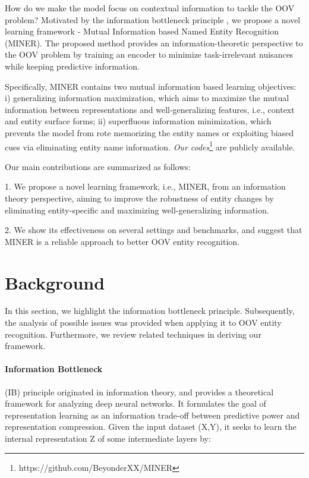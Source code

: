\documentclass[11pt]{article}
\begin{document}
How do we make the model focus on contextual information to tackle the OOV problem? Motivated by the information bottleneck principle \cite{tishby2000information}, we propose a novel learning framework - Mutual Information based Named Entity Recognition (MINER). The proposed method provides an information-theoretic perspective to the OOV problem by training an encoder to minimize task-irrelevant nuisances while keeping predictive information.


Specifically, MINER contains two mutual information based learning objectives: i) generalizing information maximization, which aims to maximize the mutual information between representations and well-generalizing features, i.e., context and entity surface forms; ii) superfluous information minimization, which prevents the model from rote memorizing the entity names or exploiting biased cues via eliminating entity name information. \textit{Our codes}\footnote{https://github.com/BeyonderXX/MINER} are publicly available.
 

Our main contributions are summarized as follows:

1. We propose a novel learning framework, i.e., MINER, from an information theory perspective, aiming to improve the robustness of entity changes by eliminating entity-specific and maximizing well-generalizing information.

2. We show its effectiveness on several settings and benchmarks, and suggest that MINER is a reliable approach to better OOV entity recognition.

\section{Background}
In this section, we highlight the information bottleneck principle. Subsequently, the analysis of possible issues was provided when applying it to OOV entity recognition. Furthermore, we review related techniques in deriving our framework.

\paragraph{Information Bottleneck}(IB) principle originated in information theory, and provides a theoretical framework for analyzing deep neural networks.  It formulates the goal of representation learning as an information trade-off between predictive power and representation compression. Given the input dataset (X,Y), it seeks to learn the internal representation Z of some intermediate layers by:
\end{document}
